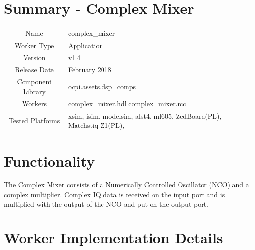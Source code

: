 \documentclass{article}
\author{} %
\date{Version \docVersion} %
\title{\docTitle}
\def\docVersion{1.4}
\def\comp{complex\_mixer}
\def\Comp{Complex Mixer}
\begin{document}
\section*{Summary - \Comp}
\begin{tabular}{|c|M{13.5cm}|}
	\hline
	                  &                                                    \\
	\hline
	Name              & \comp                                              \\
	\hline
	Worker Type       & Application                                        \\
	\hline
	Version           & v\docVersion \\
	\hline
	Release Date      & February 2018 \\
	\hline
	Component Library & ocpi.assets.dsp\_comps                              \\
	\hline
	Workers           & \comp.hdl \comp.rcc                                 \\
	\hline
	Tested Platforms  & xsim, isim, modelsim, alst4, ml605, ZedBoard(PL), Matchstiq-Z1(PL), \\
	\hline
\end{tabular}

\section*{Functionality}
\begin{flushleft}
	The Complex Mixer consists of a Numerically Controlled Oscillator (NCO) and a complex multiplier. Complex IQ data is received on the input port and is multiplied with the output of the NCO and put on the output port.
\end{flushleft}

\section*{Worker Implementation Details}
\end{document}
